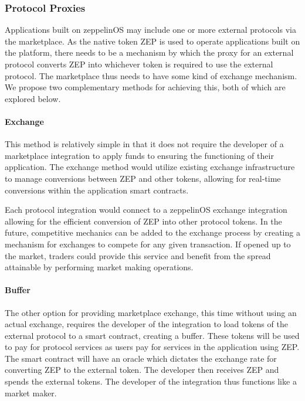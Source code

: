 \documentclass[]{article}
\makeatletter
\let\oldparagraph\paragraph
\renewcommand{\paragraph}[1]{\oldparagraph{#1}\mbox{}}
\DeclareRobustCommand{\_}{%
  \leavevmode\vbox{%
    \hrule\@width.5em
          \@height-.26ex
          \@depth\dimexpr.26ex+.28pt\relax}}
\makeatother
\begin{document}
\subsubsection{Protocol Proxies}

Applications built on zeppelinOS may include one or more external
protocols via the marketplace. As the native token ZEP is used to
operate applications built on the platform, there needs to be a
mechanism by which the proxy for an external protocol converts ZEP into
whichever token is required to use the external protocol. The
marketplace thus needs to have some kind of exchange mechanism. We
propose two complementary methods for achieving this, both of which
are explored below. 

\paragraph{Exchange}

This method is relatively simple in that it does not require the
developer of a marketplace integration to apply funds to ensuring the
functioning of their application. The exchange method would utilize
existing exchange infrastructure to manage conversions between ZEP and
other tokens, allowing for real-time conversions within the
application smart contracts.

Each protocol integration would connect to a zeppelinOS exchange integration
allowing for the efficient conversion of ZEP into other protocol tokens. In the
future, competitive mechanics can be added to the exchange process by creating
a mechanism for exchanges to compete for any given transaction. If opened up to
the market, traders could provide this service and benefit from the spread
attainable by performing market making operations.

\paragraph{Buffer}

The other option for providing marketplace exchange, this time without
using an actual exchange, requires the developer of the integration to
load tokens of the external protocol to a smart contract, creating a
buffer. These tokens will be used to pay for protocol services as users
pay for services in the application using ZEP. The smart contract will
have an oracle which dictates the exchange rate for converting ZEP to
the external token. The developer then receives ZEP and spends the
external tokens. The developer of the integration thus functions like a
market maker. 
\end{document}
